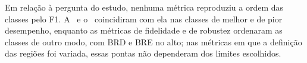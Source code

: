 Em relação à pergunta do estudo, nenhuma métrica reproduziu a ordem das classes pelo F1. A \CS\ e o \RL\ coincidiram com ela nas classes de melhor e de pior desempenho, enquanto as métricas de fidelidade e de robustez ordenaram as classes de outro modo, com BRD e BRE no alto; nas métricas em que a definição das regiões foi variada, essas pontas não dependeram dos limites escolhidos.
